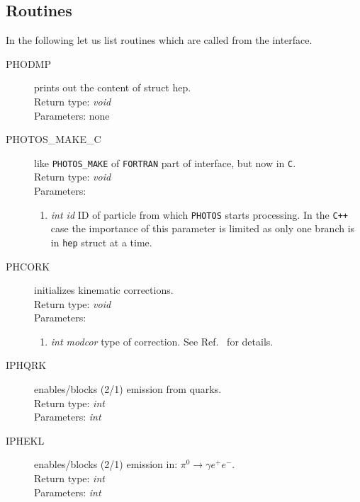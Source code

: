 \documentclass[]{Photos_interface_design}
\begin{document}
\subsection{Routines}

In the following let us list routines which are called from the interface.

\begin{description}
\item[PHODMP] prints out the content of struct hep. \\
  Return type: \textit{void} \\
  Parameters: none
\end{description}

\begin{description}
\item[PHOTOS\_MAKE\_C]  like {\tt PHOTOS\_MAKE} of {\tt FORTRAN} part of interface, but now in {\tt C}. \\
  Return type: \textit{void} \\
  Parameters:
  \begin{enumerate}
    \item \textit {int id} ID of particle from which {\tt PHOTOS} starts 
processing. In the {\tt C++} case the importance of this parameter is limited 
as only one branch is in {\tt hep} struct at a time. 
  \end{enumerate}
\end{description}

\begin{description}
\item[PHCORK] initializes kinematic corrections. \\
  Return type: \textit{void} \\
  Parameters:
  \begin{enumerate}
    \item \textit {int modcor} type of correction. See Ref.~\cite{Golonka:2005pn}  for details.
  \end{enumerate}
\end{description}


\begin{description}
\item[IPHQRK] enables/blocks (2/1) emission from quarks. \\
  Return type: \textit{int} \\
  Parameters: \textit{int}
\end{description}

\begin{description}
\item[IPHEKL] enables/blocks (2/1) emission in: $\pi^0 \rightarrow \gamma e^+ e^-$. \\
  Return type: \textit{int} \\
  Parameters: \textit{int}
\end{description}
\end{document}
